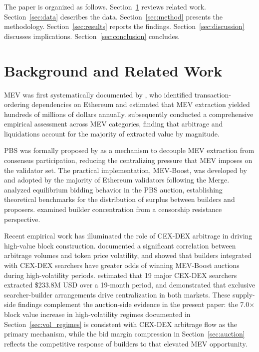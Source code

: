 \documentclass[11pt]{article}
\begin{document}
The paper is organized as follows. Section~\ref{sec:background} reviews related
work. Section~\ref{sec:data} describes the data. Section~\ref{sec:method}
presents the methodology. Section~\ref{sec:results} reports the findings.
Section~\ref{sec:discussion} discusses implications.
Section~\ref{sec:conclusion} concludes.

\section{Background and Related Work}
\label{sec:background}

MEV was first systematically documented by \citet{daian2020}, who identified
transaction-ordering dependencies on Ethereum and estimated that MEV extraction
yielded hundreds of millions of dollars annually. \citet{qin2022} subsequently
conducted a comprehensive empirical assessment across MEV categories, finding
that arbitrage and liquidations account for the majority of extracted value by
magnitude.

PBS was formally proposed by \citet{buterin2021} as a mechanism to decouple MEV
extraction from consensus participation, reducing the centralizing pressure that
MEV imposes on the validator set. The practical implementation, MEV-Boost, was
developed by \citet{flashbots2022} and adopted by the majority of Ethereum
validators following the Merge. \citet{bahrani2024} analyzed equilibrium bidding
behavior in the PBS auction, establishing theoretical benchmarks for the
distribution of surplus between builders and proposers. \citet{wahrstatter2023}
examined builder concentration from a censorship resistance perspective.

Recent empirical work has illuminated the role of CEX-DEX arbitrage in driving
high-value block construction. \citet{heimbach2024} documented a significant
correlation between arbitrage volumes and token price volatility, and showed
that builders integrated with CEX-DEX searchers have greater odds of winning
MEV-Boost auctions during high-volatility periods. \citet{wu2025} estimated that
19 major CEX-DEX searchers extracted \$233.8M USD over a 19-month period, and
demonstrated that exclusive searcher-builder arrangements drive centralization
in both markets. These supply-side findings complement the auction-side evidence
in the present paper: the 7.0$\times$ block value increase in high-volatility
regimes documented in Section~\ref{sec:vol_regimes} is consistent with CEX-DEX arbitrage flow as
the primary mechanism, while the bid margin compression in Section~\ref{sec:auction} reflects
the competitive response of builders to that elevated MEV opportunity.
\end{document}
